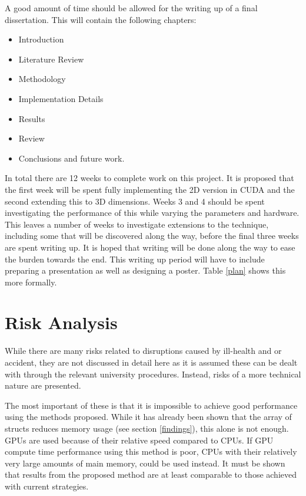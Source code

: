 \documentclass[a4paper,12pt]{article}
\begin{document}
A good amount of time should be allowed for the writing up of a final dissertation. This will contain the following chapters:

\begin{itemize}
\item Introduction
\item Literature Review
\item Methodology
\item Implementation Details
\item Results
\item Review
\item Conclusions and future work.
\end{itemize}



In total there are 12 weeks to complete work on this project. It is proposed that the first week will be spent fully implementing the 2D version in CUDA and the second extending this to 3D dimensions. Weeks 3 and 4 should be spent investigating the performance of this while varying the parameters and hardware. This leaves a number of weeks to investigate extensions to the technique, including some that will be discovered along the way, before the final three weeks are spent writing up. It is hoped that writing will be done along the way to ease the burden towards the end. This writing up period will have to include preparing a presentation as well as designing a poster. Table \ref{plan} shows this more formally.



\section{Risk Analysis}
While there are many risks related to disruptions caused by ill-health and or accident, they are not discussed in detail here as it is assumed these can be dealt with through the relevant university procedures. Instead, risks of a more technical nature are presented.

The most important of these is that it is impossible to achieve good performance using the methods proposed. While it has already been shown that the array of structs reduces memory usage (see section \ref{findings}), this alone is not enough. GPUs are used because of their relative speed compared to CPUs. If GPU compute time performance using this method is poor, CPUs with their relatively very large amounts of main memory, could be used instead. It must be shown that results from the proposed method are at least comparable to those achieved with current strategies.
\end{document}
